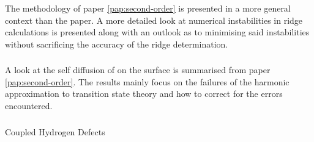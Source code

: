 \subsubsection{}
The methodology of paper \ref{pap:second-order} is presented in a more general context than the paper.
A more detailed look at numerical instabilities in ridge calculations is presented along with an outlook as to minimising said instabilities without sacrificing the accuracy of the ridge determination.

\subsubsection{}
A look at the self diffusion of  on the  surface is summarised from paper \ref{pap:second-order}.
The results mainly focus on the failures of the harmonic approximation to transition state theory and how to correct for the errors encountered.

\subsubsection{}
Coupled Hydrogen Defects \expand

